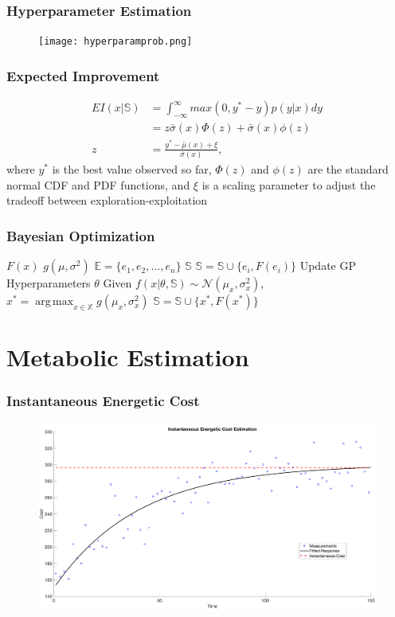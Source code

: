 \documentclass[compress, xcolor=pst]{beamer}
\DeclareMathOperator*{\argmax}{arg\,max}
\begin{document}
\begin{frame}
	\frametitle{\textbf{Hyperparameter Estimation}}
	\begin{figure}
	\centering
	\texttt{[image: hyperparamprob.png]}
	\end{figure}
\end{frame}

\begin{frame}
	\frametitle{\textbf{Expected Improvement}}
	\begin{align*}
	  EI(x\vert \mathbb{S}) &= \int_{-\infty}^\infty max(0, y^*-y)p(y\vert x)dy\\
	    &= z\bar{\sigma}(x)\Phi(z) + \bar{\sigma}(x)\phi(z)\\
	  z &= \frac{y^* - \bar{\mu}(x) + \xi}{\bar{\sigma}(x)},
	\end{align*}
	where $y^*$ is the best value observed so far, $\Phi(z)$ and $\phi(z)$ are the standard normal CDF and PDF functions, and $\xi$ is a scaling parameter to adjust the tradeoff between exploration-exploitation
\end{frame}

\begin{frame}
	\frametitle{\textbf{Bayesian Optimization}}
	\begin{algorithmic}
	\State {} $F(x)$
	\State {} $g(\mu, \sigma^2)$
	\State {} $\mathbb{E} = \{e_1, e_2, ..., e_n\}$
	\State {} $\mathbb{S}$
	  \State $\mathbb{S} = \mathbb{S} \cup \{e_i, F(e_i)\}$
	\End
	  \State Update GP Hyperparameters $\theta$
	  \State Given $f(x\vert \theta, \mathbb{S}) \sim \mathcal{N}(\mu_x, \sigma_x^2)$,
	  \State $x^* = \argmax_{x \in \mathbb{X}} g(\mu_x, \sigma_x^2)$
	  \State $\mathbb{S} = \mathbb{S} \cup \{x^*, F(x^*)\}$
	\End
	\end{algorithmic}
\end{frame}

\section{Metabolic Estimation}
\begin{frame}
	\frametitle{\textbf{Instantaneous Energetic Cost}}
	\begin{figure}
	\centering
	\includegraphics[width=\textwidth]{metabolicestimation.png}
	\end{figure}
\end{frame}
\end{document}

